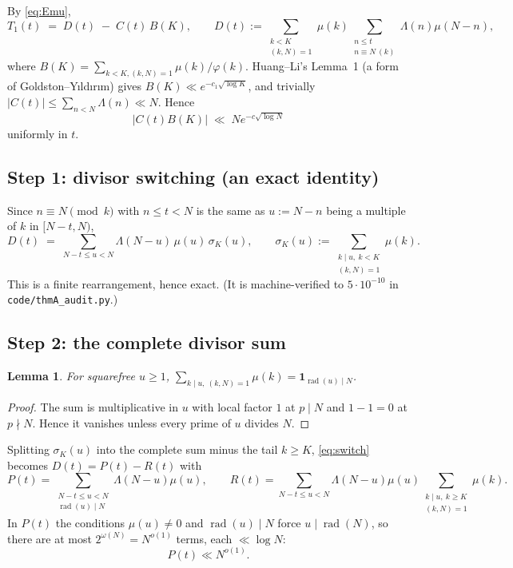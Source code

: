 \documentclass[11pt,a4paper]{article}
\theoremstyle{plain}
\newtheorem{lemma}[theorem]{Lemma}
\theoremstyle{definition}
\DeclareMathOperator{\rad}{rad}
\begin{document}
By \eqref{eq:Emu},
\begin{equation}\label{eq:split0}
  T_1(t) \;=\; D(t) \;-\; C(t)\,B(K),
  \qquad
  D(t):=\sum_{\substack{k<K\\(k,N)=1}}\mu(k)
        \sum_{\substack{n\le t\\ n\equiv N\ (k)}}\Lambda(n)\mu(N-n),
\end{equation}
where $B(K)=\sum_{k<K,(k,N)=1}\mu(k)/\varphi(k)$. Huang--Li's Lemma~1
(a form of Goldston--Y{\i}ld{\i}r{\i}m) gives
$B(K)\ll e^{-c_1\sqrt{\log K}}$, and trivially
$|C(t)|\le\sum_{n<N}\Lambda(n)\ll N$. Hence
\begin{equation}\label{eq:meanterm}
  |C(t)B(K)| \;\ll\; N e^{-c\sqrt{\log N}}
\end{equation}
uniformly in $t$.

\subsection{Step 1: divisor switching (an exact identity)}

Since $n\equiv N\pmod k$ with $n\le t<N$ is the same as $u:=N-n$ being a
multiple of $k$ in $[N-t,N)$,
\begin{equation}\label{eq:switch}
  D(t) \;=\; \sum_{N-t\le u<N}\Lambda(N-u)\,\mu(u)\,\sigma_K(u),
  \qquad
  \sigma_K(u):=\sum_{\substack{k\mid u,\ k<K\\ (k,N)=1}}\mu(k) .
\end{equation}
This is a finite rearrangement, hence exact. (It is machine-verified to
$5\cdot10^{-10}$ in \texttt{code/thmA\_audit.py}.)

\subsection{Step 2: the complete divisor sum}

\begin{lemma}\label{lem:complete}
For squarefree $u\ge1$,
$\displaystyle\sum_{k\mid u,\ (k,N)=1}\mu(k)=\mathbf 1_{\rad(u)\mid N}$.
\end{lemma}

\begin{proof}
The sum is multiplicative in $u$ with local factor $1$ at $p\mid N$ and
$1-1=0$ at $p\nmid N$. Hence it vanishes unless every prime of $u$
divides $N$.
\end{proof}

Splitting $\sigma_K(u)$ into the complete sum minus the tail $k\ge K$,
\eqref{eq:switch} becomes $D(t)=P(t)-R(t)$ with
\begin{equation}\label{eq:PR}
  P(t)=\!\!\sum_{\substack{N-t\le u<N\\ \rad(u)\mid N}}\!\!\Lambda(N-u)\mu(u),
  \qquad
  R(t)=\!\!\sum_{N-t\le u<N}\!\!\Lambda(N-u)\mu(u)
       \sum_{\substack{k\mid u,\ k\ge K\\ (k,N)=1}}\mu(k).
\end{equation}
In $P(t)$ the conditions $\mu(u)\ne0$ and $\rad(u)\mid N$ force
$u\mid\rad(N)$, so there are at most $2^{\omega(N)}=N^{o(1)}$ terms, each
$\ll\log N$:
\begin{equation}\label{eq:P}
  P(t)\ll N^{o(1)} .
\end{equation}
\end{document}
